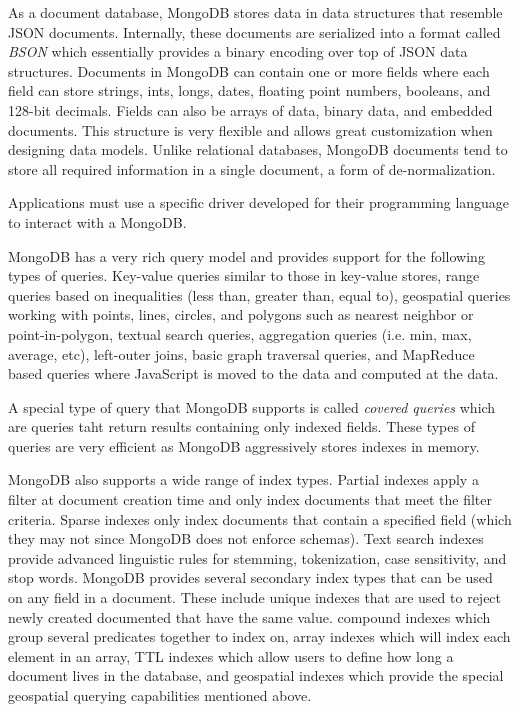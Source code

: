 \documentclass[]{article}
\begin{document}
As a document database, MongoDB stores data in data structures that resemble JSON documents. Internally, these documents are serialized into a format called \textit{BSON} which essentially provides a binary encoding over top of JSON data structures. Documents in MongoDB can contain one or more fields where each field can store strings, ints, longs, dates, floating point numbers, booleans, and 128-bit decimals. Fields can also be arrays of data, binary data, and embedded documents. This structure is very flexible and allows great customization when designing data models. Unlike relational databases, MongoDB documents tend to store all required information in a single document, a form of de-normalization.

Applications must use a specific driver developed for their programming language to interact with a MongoDB\cite{chen_big_2014}.

MongoDB has a very rich query model and provides support for the following types of queries. Key-value queries similar to those in key-value stores, range queries based on inequalities (less than, greater than, equal to), geospatial queries working with points, lines, circles, and polygons such as nearest neighbor or point-in-polygon, textual search queries, aggregation queries (i.e. min, max, average, etc), left-outer joins, basic graph traversal queries, and MapReduce based queries where JavaScript is moved to the data and computed at the data.

A special type of query that MongoDB supports is called \textit{covered queries} which are queries taht return results containing only indexed fields. These types of queries are very efficient as MongoDB aggressively stores indexes in memory.

MongoDB also supports a wide range of index types. Partial indexes apply a filter at document creation time and only index documents that meet the filter criteria. Sparse indexes only index documents that contain a specified field (which they may not since MongoDB does not enforce schemas). Text search indexes provide advanced linguistic rules for stemming, tokenization, case sensitivity, and stop words. MongoDB provides several secondary index types that can be used on any field in a document. These include unique indexes that are used to reject newly created documented that have the same value. compound indexes which group several predicates together to index on, array indexes which will index each element in an array, TTL indexes which allow users to define how long a document lives in the database, and geospatial indexes which provide the special geospatial querying capabilities mentioned above.
\end{document}
